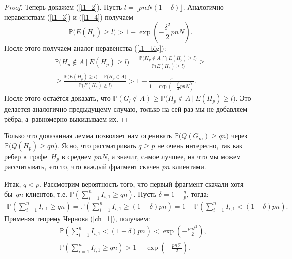 \documentclass{matmex-diploma-custom}
\newcommand{\PRob}{\mathbb P}
\newcommand{\geqs}{\geqslant}
\newcommand{\eps}{\varepsilon}
\theoremstyle{named}
\begin{document}
\begin{proof}
Теперь докажем (\ref{l1_2}). Пусть $l = \lfloor pnN(1-\delta) \rfloor$. Аналогично неравенствам (\ref{l1_3}) и (\ref{l1_4}) получаем
\begin{equation} \label{l1_5}
\PRob\big( E(H_p) \geqs l \big) > 1 - \exp\left(-\frac{\delta^2}{2}pnN\right).
\end{equation}
После этого получаем аналог неравенства (\ref{l1_big}):
\begin{equation}\label{l1_big2}
\begin{aligned}
	\PRob\Big( H_p \not\in A~\big|~E(H_p) \geqs l \Big)
=
	\frac{
		\PRob\Big( H_p \not\in A~\bigcap~E(H_p) \geqs l \Big)
	}{
		\PRob\big(E(H_p) \geqs l \big)
	} 
\geqs
\\
\geqs
	\frac{
		\PRob\big(E(H_p) \geqs l \big) 
			-
		\PRob\big(H_p \in A \big)
	}{
		\PRob\big(E(H_p) \geqs l\big)
	}
>
	1
		-
	\frac{\eps}{
		1 - \exp\left(-\frac{\delta^2}{2}pnN\right)
	}.
\end{aligned}\end{equation}
После этого остаётся доказать, что $\PRob(G_l \not\in A) \geqs \PRob\Big( H_p \not\in A~\big|~ E(H_p) \geqs l \Big)$.
Это делается аналогично предыдущему случаю, только на сей раз мы не добавляем рёбра, а~равномерно выкидываем их.
\end{proof}

\bigskip

Только что доказанная лемма позволяет нам оценивать $\PRob\big(Q(G_m) \geqs qn\big)$ через $\PRob\big(Q(H_p) \geqs q n\big)$.
Ясно, что рассматривать $q \geqs p$ не очень интересно, так как ребер в~графе~$H_p$ в среднем $p nN$, 
а значит, самое лучшее, на что мы можем рассчитывать, это то, что каждый фрагмент скачен $p n$ клиентами.

Итак, $q < p$. Рассмотрим вероятность того, что первый фрагмент скачали хотя бы~$qn$ клиентов, 
т.е. $\PRob\left(\sum\limits_{i=1}^n I_{i,1} \geqs qn\right)$. Пусть $\delta = 1 - \frac{q}{p}$, тогда:
\begin{align*}
\PRob\left(\sum_{i=1}^n I_{i,1} \geqs qn\right) = \PRob\left(\sum_{i=1}^n I_{i,1} \geqs (1 - \delta) pn\right) 
= 1 - \PRob\left(\sum_{i=1}^n I_{i,1} < (1 - \delta) pn\right).
\end{align*}
Применяя теорему Чернова (\ref{ch_1}), получаем:
\begin{align}
&\PRob\left(\sum_{i=1}^n I_{i,1} < (1 - \delta) pn\right) < \exp\left(- \frac{pn \delta^2}{2} \right),
\\
&\PRob\left(\sum_{i=1}^n I_{i,1} \geqs qn\right) > 1 - \exp\left(- \frac{pn \delta^2}{2} \right).
\end{align}
\end{document}
